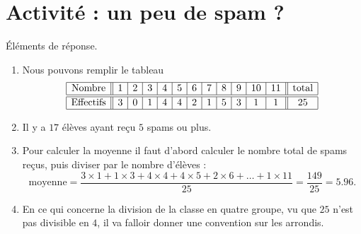 



\setcounter{section}{-1}
\section{Activité : un peu de spam ?}



Éléments de réponse.

\begin{enumerate}
    \item
Nous pouvons remplir le tableau
\begin{equation*}
    \begin{array}[]{|c||c|c|c|c|c|c|c|c|c|c|c|| c |}
        \hline
        \text{Nombre}&1&2&3&4&5&6&7&8&9&10&11&\text{total}\\
        \hline\hline
        \text{Effectifs}&3&0&1&4&4&2&1&5&3&1&1&25\\
        \hline
    \end{array}
\end{equation*}
\item
Il y a \( 17\) élèves ayant reçu \( 5\) spams ou plus.
     \item
         Pour calculer la moyenne il faut d'abord calculer le nombre total de spams reçus, puis diviser par le nombre d'élèves :
         \begin{equation}
             \text{moyenne}=\frac{ 3\times 1+1\times 3+4\times 4+4\times 5+2\times 6+\ldots+1\times 11 }{ 25 }=\frac{ 149 }{ 25 }=5.96.            
         \end{equation}
     \item
         En ce qui concerne la division de la classe en quatre groupe, vu que \( 25\) n'est pas divisible en \( 4\), il va falloir donner une convention sur les arrondis.
\end{enumerate}

